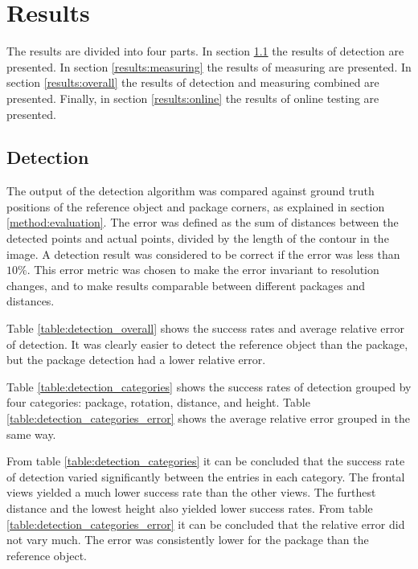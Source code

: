 \chapter{Results} \label{results}
The results are divided into four parts.
In section \ref{results:detection} the results of detection are presented.
In section \ref{results:measuring} the results of measuring are presented.
In section \ref{results:overall} the results of detection and measuring combined are presented.
Finally, in section \ref{results:online} the results of online testing are presented.

\section{Detection} \label{results:detection}
The output of the detection algorithm was compared against ground truth positions of the reference object and package corners, as explained in section \ref{method:evaluation}.
The error was defined as the sum of distances between the detected points and actual points, divided by the length of the contour in the image.
A detection result was considered to be correct if the error was less than $10\%$.
This error metric was chosen to make the error invariant to resolution changes, and to make results comparable between different packages and distances.

Table \ref{table:detection_overall} shows the success rates and average relative error of detection.
It was clearly easier to detect the reference object than the package, but the package detection had a lower relative error.



Table \ref{table:detection_categories} shows the success rates of detection grouped by four categories: package, rotation, distance, and height. Table \ref{table:detection_categories_error} shows the average relative error grouped in the same way.





From table \ref{table:detection_categories} it can be concluded that the success rate of detection varied significantly between the entries in each category.
The frontal views yielded a much lower success rate than the other views.
The furthest distance and the lowest height also yielded lower success rates.
From table \ref{table:detection_categories_error} it can be concluded that the relative error did not vary much.
The error was consistently lower for the package than the reference object.

